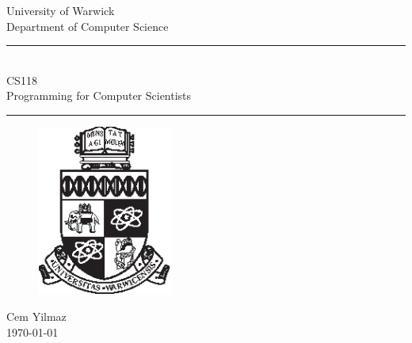 \documentclass[11pt,a4 paper]{book}
\theoremstyle{plain}
\theoremstyle{definition}
\theoremstyle{remark}
\begin{document}
\begin{titlepage}
\begin{center}
\large
University of Warwick \\
Department of Computer Science \\
\huge
\vspace{50mm}
\rule{\linewidth}{0.5pt} \\
CS118 \\
\vspace{5mm}
\Large
Programming for Computer Scientists
\rule{\linewidth}{0.5pt}
\vspace{5mm}
\begin{figure}[H]
\centering
\includegraphics[width=0.4\textwidth]{crest_black.eps}
\end{figure}
\vspace{37mm}
Cem Yilmaz\\
\today
\end{center}
\end{titlepage}
\newpage
\tableofcontents
\newpage
{}
\setcounter{page}{1}
\end{document}
